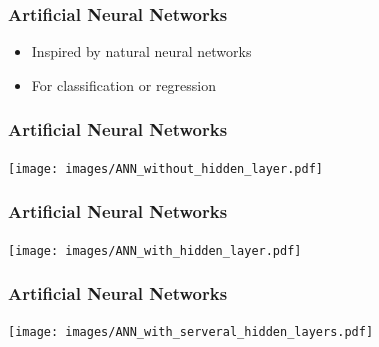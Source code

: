 \documentclass[aspectratio=169]{beamer}
\begin{document}
\setcounter{tocdepth}{2}
\begin{frame}{}
   \tableofcontents[currentsubsection]
\end{frame}


\begin{frame}
  \begin{block}{}
    \begin{center}
      \frametitle{Artificial Neural Networks}
      \begin{itemize}
      \item Inspired by natural neural networks
      \item For classification or regression
      \end{itemize}
    \end{center}  
  \end{block}  
\end{frame}


\begin{frame}
  \frametitle{Artificial Neural Networks}
  \begin{center}    
    \texttt{[image: images/ANN\_without\_hidden\_layer.pdf]}
  \end{center}  
\end{frame}

\begin{frame}
  \frametitle{Artificial Neural Networks}
  \begin{center}
    \texttt{[image: images/ANN\_with\_hidden\_layer.pdf]}
  \end{center}  
\end{frame}

\begin{frame}
  \frametitle{Artificial Neural Networks}
  \begin{center}
    \texttt{[image: images/ANN\_with\_serveral\_hidden\_layers.pdf]}
  \end{center}  
\end{frame}


\end{document}
